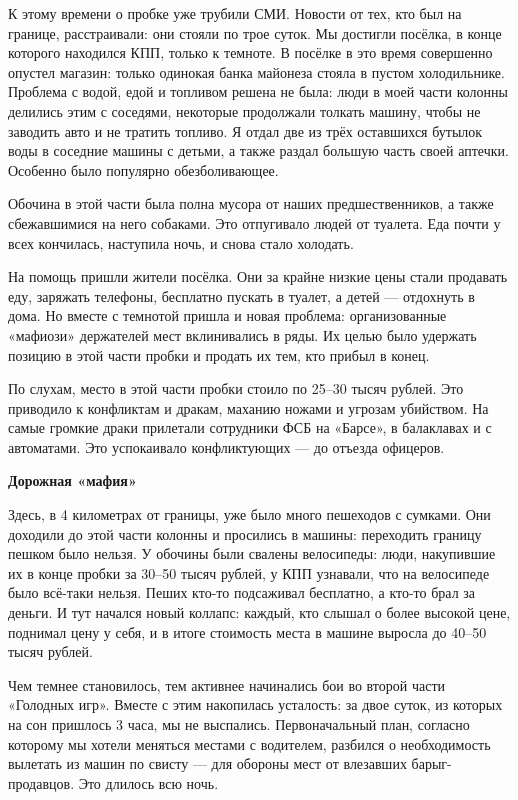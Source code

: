 К этому времени о пробке уже трубили СМИ. Новости от тех, кто был на границе, расстраивали: они стояли по трое суток. Мы достигли посёлка, в конце которого находился КПП, только к темноте. В посёлке в это время совершенно опустел магазин: только одинокая банка майонеза стояла в пустом холодильнике. Проблема с водой, едой и топливом решена не была: люди в моей части колонны делились этим с соседями, некоторые продолжали толкать машину, чтобы не заводить авто и не тратить топливо. Я отдал две из трёх оставшихся бутылок воды в соседние машины с детьми, а также раздал большую часть своей аптечки. Особенно было популярно обезболивающее.


Обочина в этой части была полна мусора от наших предшественников, а также сбежавшимися на него собаками. Это отпугивало людей от туалета. Еда почти у всех кончилась, наступила ночь, и снова стало холодать.

На помощь пришли жители посёлка. Они за крайне низкие цены стали продавать еду, заряжать телефоны, бесплатно пускать в туалет, а детей — отдохнуть в дома. Но вместе с темнотой пришла и новая проблема: организованные «мафиози» держателей мест вклинивались в ряды. Их целью было удержать позицию в этой части пробки и продать их тем, кто прибыл в конец.

По слухам, место в этой части пробки стоило по 25–30 тысяч рублей. Это приводило к конфликтам и дракам, маханию ножами и угрозам убийством. На самые громкие драки прилетали сотрудники ФСБ на «Барсе», в балаклавах и с автоматами. Это успокаивало конфликтующих — до отъезда офицеров.


\textbf{Дорожная «мафия»}

Здесь, в 4 километрах от границы, уже было много пешеходов с сумками. Они доходили до этой части колонны и просились в машины: переходить границу пешком было нельзя. У обочины были свалены велосипеды: люди, накупившие их в конце пробки за 30–50 тысяч рублей, у КПП узнавали, что на велосипеде было всё-таки нельзя. Пеших кто-то подсаживал бесплатно, а кто-то брал за деньги. И тут начался новый коллапс: каждый, кто слышал о более высокой цене, поднимал цену у себя, и в итоге стоимость места в машине выросла до 40–50 тысяч рублей.

Чем темнее становилось, тем активнее начинались бои во второй части «Голодных игр». Вместе с этим накопилась усталость: за двое суток, из которых на сон пришлось 3 часа, мы не выспались. Первоначальный план, согласно которому мы хотели меняться местами с водителем, разбился о необходимость вылетать из машин по свисту — для обороны мест от влезавших барыг-продавцов. Это длилось всю ночь.

